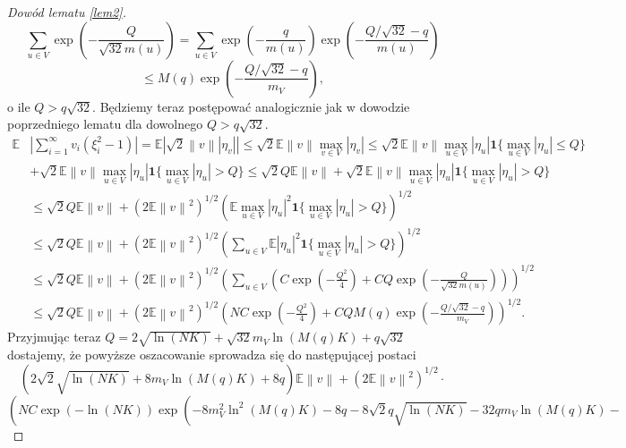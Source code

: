\documentclass[man,mfiu]{mgrwms}
\newcommand{\norm}[1]{\left\lVert#1\right\rVert}
\begin{document}
\begin{proof}[Dowód lematu \ref{lem2}]
\begin{displaymath}
\sum_{u\in V}\exp\left(-\frac{Q}{\sqrt{32}m(u)}\right)=\sum_{u\in V}\exp\left(-\frac{q}{m(u)}\right)\exp \left(-\frac{Q/\sqrt{32}-q}{m(u)}\right)
\end{displaymath}
\begin{displaymath}
\leq M(q)\exp \left(-\frac{Q/\sqrt{32}-q}{m_V}\right),
\end{displaymath}
o ile $Q>q\sqrt{32}$. Będziemy teraz postępować analogicznie jak w dowodzie poprzedniego lematu dla dowolnego $Q>q\sqrt{32}$.
\begin{displaymath}
\begin{split}
\mathbb{E}&\left|\sum_{i=1}^{\infty}v_i(\xi_i^2-1)\right|=\mathbb{E}\left|\sqrt{2}\norm{v}|\eta_v|\right|\leq \sqrt{2}\mathbb{E}\norm{v}\max_{v\in V}|\eta_v|
\leq \sqrt{2}\mathbb{E}\norm{v}\max_{u\in V}|\eta_u|\pmb{1}\{\max_{u\in V}|\eta_u|\leq Q\}\\
&+\sqrt{2}\mathbb{E}\norm{v}\max_{u\in V}|\eta_u|\pmb{1}\{\max_{u\in V}|\eta_u|> Q\}
\leq \sqrt{2}Q\mathbb{E}\norm{v}+\sqrt{2}\mathbb{E}\norm{v}\max_{u\in V}|\eta_u|\pmb{1}\{\max_{u\in V}|\eta_u|> Q\}\\
&\leq \sqrt{2}Q\mathbb{E}\norm{v}+\left(2\mathbb{E}\norm{v}^2\right)^{1/2}\left(\mathbb{E}\max_{u\in V}|\eta_u|^2\pmb{1}\{\max_{u\in V}|\eta_u|> Q\}\right)^{1/2}\\
&\leq \sqrt{2}Q\mathbb{E}\norm{v}+\left(2\mathbb{E}\norm{v}^2\right)^{1/2}\left(\sum_{u\in V}\mathbb{E}|\eta_u|^2\pmb{1}\{\max_{u\in V}|\eta_u|> Q\}\right)^{1/2}\\
&\leq \sqrt{2}Q\mathbb{E}\norm{v}+\left(2\mathbb{E}\norm{v}^2\right)^{1/2}\left(\sum_{u\in V}\left(C\exp\left(-\frac{Q^2}{4}\right)+CQ\exp \left(-\frac{Q}{\sqrt{32}m(u)}\right)\right)\right)^{1/2} \\
&\leq \sqrt{2}Q\mathbb{E}\norm{v}+\left(2\mathbb{E}\norm{v}^2\right)^{1/2}\left(NC\exp\left(-\frac{Q^2}{4}\right)+CQM(q)\exp \left(-\frac{Q/\sqrt{32}-q}{m_V}\right)\right)^{1/2}.
\end{split}
\end{displaymath}
Przyjmując teraz $Q=2\sqrt{\ln (NK)}+\sqrt{32}m_V\ln (M(q)K)+q\sqrt{32}$ dostajemy, że powyższe oszacowanie sprowadza się do następującej postaci
\begin{displaymath}
\left(2\sqrt{2}\sqrt{\ln (NK)}+8m_V\ln (M(q)K)+8q\right)\mathbb{E}\norm{v}+\left(2\mathbb{E}\norm{v}^2\right)^{1/2}\cdot
\end{displaymath}
\begin{displaymath}
\left(NC\exp\left(-\ln (NK)\right)\exp\left(-8m^2_V\ln^2 (M(q)K)-8q-8\sqrt{2}q\sqrt{\ln (NK)}-32qm_V\ln (M(q)K)-\right.\right.

\end{displaymath}
\end{proof}
\end{document}
